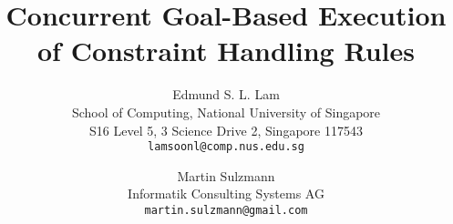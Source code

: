 \documentclass{tlp}
\begin{document}
\def\ruleform#1{{\setlength{\fboxrule}{1pt}\fbox{\normalsize $#1$}}}
\newcommand{\ms}[1]{\marginpar{\sc ms}{\bf #1}}

\newcommand{\atsign}{@}

\newcommand{\simparrow}[0]{\Longleftrightarrow}
\newcommand{\proparrow}[0]{\Longrightarrow}
\newcommand{\arrow}[0]{\rightarrow}

\renewcommand{\rlabel}[1]{\mbox{$\mathit{#1}$}}
\newcommand{\blabel}[1]{\mbox{\bf (#1)}}
\newcommand{\Leq}{\mathit{Leq}}
\newcommand{\LL}{\mathit{L}}
\newcommand{\Merge}{\mathit{Merge}}
\newcommand{\MM}{\mathit{M}}
\newcommand{\Get}{\mathit{Get}}
\newcommand{\Put}{\mathit{Put}}
\newcommand{\Gcd}{\mathit{Gcd}}
\newcommand{\True}{\mathit{True}}

\newcommand{\ignore}[1]{}

\newcommand{\abssem}{{\cal A}}
\newcommand{\goalsem}{{\cal G}}
\newcommand{\pargoalsem}{{\parallel \cal G}}

\newcommand{\abstrans}{\rightarrowtail_{\cal A}}
\newcommand{\abstransstar}{\rightarrowtail^*_{\cal A}}
\newcommand{\goaltrans}{\rightarrowtail_{\cal G}}
\newcommand{\goaltransstar}{\rightarrowtail^*_{\cal G}}
\newcommand{\partrans}{\rightarrowtail_{\mid\mid\cal G}}
\newcommand{\partransstar}{\rightarrowtail^*_{\mid\mid\cal G}}

\newcommand{\abscup}{\uplus}
\newcommand{\goalcup}{\uplus}
\newcommand{\stcup}{\cup}

\newcommand{\goaltranssf}[1]{\stackrel{#1}{\rightarrowtail_{\cal G}}}
\newcommand{\partranssf}[1]{\stackrel{#1}{\rightarrowtail_{\mid\mid\cal G}}}


\newcommand{\chrstate}[2]{\langle #1\mid#2 \rangle}

\long{}


\title{Concurrent Goal-Based Execution of Constraint Handling Rules}

\author[Edmund S. L. Lam and Martin Sulzmann]{
Edmund S. L. Lam \\
 School of Computing, National University of Singapore \\
 S16 Level 5, 3 Science Drive 2, Singapore 117543 \\
 {\tt lamsoonl@comp.nus.edu.sg} 
 \and 
Martin Sulzmann \\      
 Informatik Consulting Systems AG  \\
 {\tt martin.sulzmann@gmail.com}
}



\pagerange{\pageref{firstpage}--\pageref{lastpage}}
\setcounter{page}{1}
\end{document}
